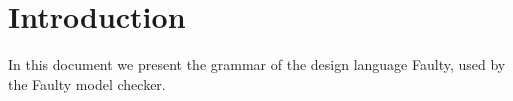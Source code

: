 \section{Introduction} 

	In this document we present the grammar of the design language Faulty, used by the Faulty model checker.